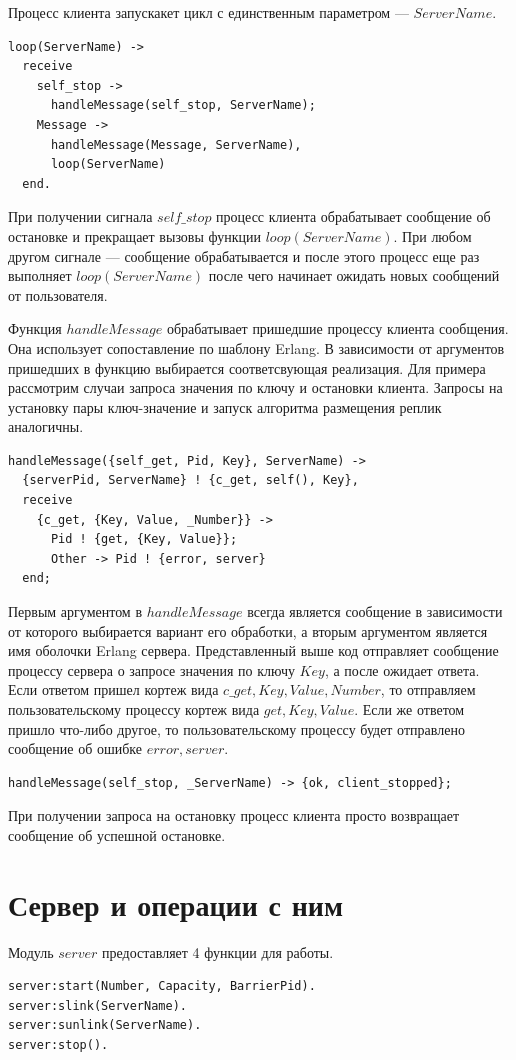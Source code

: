 		Процесс клиента запускакет цикл с единственным параметром --- $ServerName$. 
		\begin{lstlisting}
loop(ServerName) -> 
  receive
    self_stop ->
      handleMessage(self_stop, ServerName);
    Message -> 
      handleMessage(Message, ServerName), 
      loop(ServerName)
  end.
		\end{lstlisting}
		При получении сигнала $self\_stop$ процесс клиента обрабатывает сообщение об остановке и прекращает вызовы функции $loop(ServerName)$. При любом другом сигнале ---
		сообщение обрабатывается и после этого процесс еще раз выполняет $loop(ServerName)$ после чего начинает ожидать новых сообщений от пользователя.

		Функция $handleMessage$ обрабатывает пришедшие процессу клиента сообщения. Она использует сопоставление по шаблону Erlang. В зависимости от аргументов пришедших в функцию
		выбирается соответсвующая реализация. Для примера рассмотрим случаи запроса значения по ключу и остановки клиента. Запросы на установку пары ключ-значение и запуск
		алгоритма размещения реплик аналогичны.
		\begin{lstlisting}
handleMessage({self_get, Pid, Key}, ServerName) ->
  {serverPid, ServerName} ! {c_get, self(), Key},
  receive
    {c_get, {Key, Value, _Number}} ->
      Pid ! {get, {Key, Value}};
      Other -> Pid ! {error, server}
  end;
		\end{lstlisting} 
		Первым аргументом в $handleMessage$ всегда является сообщение в зависимости от которого выбирается вариант его обработки, а вторым аргументом является имя оболочки 
		Erlang сервера. Представленный выше код отправляет сообщение процессу сервера о запросе значения по ключу $Key$, а после ожидает ответа. Если ответом пришел кортеж вида
		${c\_get, {Key, Value, Number}}$, то отправляем пользовательскому процессу кортеж вида ${get, {Key, Value}}$. Если же ответом пришло что-либо другое, то пользовательскому 
		процессу будет отправлено сообщение об ошибке ${error, server}$. 

		\begin{lstlisting}
handleMessage(self_stop, _ServerName) -> {ok, client_stopped};			
		\end{lstlisting}
		При получении запроса на остановку процесс клиента просто возвращает сообщение об успешной остановке.

	\section{Сервер и операции с ним}
		Модуль $server$ предоставляет 4 функции для работы.
		\begin{lstlisting}
server:start(Number, Capacity, BarrierPid).
server:slink(ServerName).
server:sunlink(ServerName).
server:stop().			
		\end{lstlisting}

